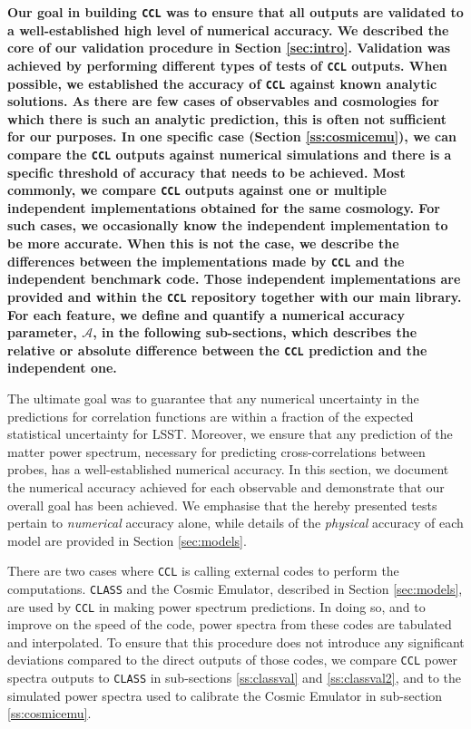 \documentclass[\docopts]{\docclass}
\newcommand{\ccl}{{\tt CCL}\xspace}
\begin{document}
{\bf Our goal in building \ccl was to ensure that all outputs are validated to a well-established high level of numerical accuracy. We described the core of our validation procedure in Section \ref{sec:intro}. Validation was achieved by performing different types of tests of \ccl outputs. When possible, we established the accuracy of \ccl against known analytic solutions. As there are few cases of observables and cosmologies for which there is such an analytic prediction, this is often not sufficient for our purposes. In one specific case (Section \ref{ss:cosmicemu}), we can compare the \ccl outputs against numerical simulations and there is a specific threshold of accuracy that needs to be achieved. Most commonly, we compare \ccl outputs against one or multiple independent implementations obtained for the same cosmology. For such cases, we occasionally know the independent implementation to be more accurate. When this is not the case, we describe the differences between the implementations made by \ccl and the independent benchmark code. Those independent implementations are provided and within the \ccl repository together with our main library. For each feature, we define and quantify a numerical accuracy parameter, $\mathcal{A}$, in the following sub-sections, which describes the relative or absolute difference between the \ccl prediction and the independent one.} 

The ultimate goal was to guarantee that any numerical uncertainty in the predictions for correlation functions are within a fraction of the expected statistical uncertainty for LSST. Moreover, we ensure that any prediction of the matter power spectrum, necessary for predicting cross-correlations between probes, has a well-established numerical accuracy. In this section, we document the numerical accuracy achieved for each observable and demonstrate that our overall goal has been achieved. We emphasise that the hereby presented tests pertain to {\it numerical} accuracy alone, while details of the {\it physical} accuracy of each model are provided in Section \ref{sec:models}. 

There are two cases where \ccl is calling external codes to perform the computations. {\tt CLASS} and the Cosmic Emulator, described in Section \ref{sec:models}, are used by \ccl in making power spectrum predictions. In doing so, and to improve on the speed of the code, power spectra from these codes are tabulated and interpolated. To ensure that this procedure does not introduce any significant deviations compared to the direct outputs of those codes, we compare \ccl power spectra outputs to {\tt CLASS} in sub-sections \ref{ss:classval} and  \ref{ss:classval2}, and to the simulated power spectra used to calibrate the Cosmic Emulator in sub-section \ref{ss:cosmicemu}.
\end{document}
